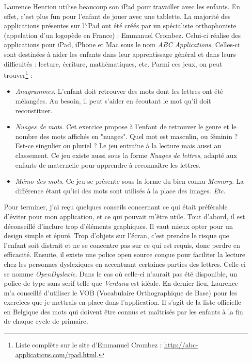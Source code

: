 Laurence Henrion utilise beaucoup son iPad pour travailler avec les enfants. En effet, c'est plus fun pour l'enfant de jouer avec une tablette.
La majorité des applications présentes sur l'iPad ont été créés par un spécialiste orthophoniste (appelation d'un logopède en France) : Emmanuel Crombez. Celui-ci réalise des applications pour iPad, iPhone et Mac sous le nom \textit{ABC Applications}. Celles-ci sont destinées à aider les enfants dans leur apprentissage général et dans leurs difficultés : lecture, écriture, mathématiques, etc. Parmi ces jeux, on peut trouver\footnote{Liste complète sur le site d'Emmanuel Crombez : \url{http://abc-applications.com/ipad.html}.} :
\begin{itemize}
\item \textit{Anagrammes}. L'enfant doit retrouver des mots dont les lettres ont été mélangées. Au besoin, il peut s'aider en écoutant le mot qu'il doit reconstituer.
\item \textit{Nuages de mots}. Cet exercice propose à l'enfant de retrouver le genre et le nombre des mots affichés en "nuages". Quel mot est masculin, ou féminin ? Est-ce singulier ou pluriel ? Le jeu entraîne à la lecture mais aussi au classement. Ce jeu existe aussi sous la forme \textit{Nuages de lettres}, adapté aux enfants de maternelle pour apprendre à reconnaître les lettres.
\item \textit{Mémo des mots}. Ce jeu se présente sous la forme du bien connu \textit{Memory}. La différence étant qu'ici des mots sont utilisés à la place des images.
\textit{Etc.}\\
\end{itemize}

Pour terminer, j'ai reçu quelques conseils concernant ce qui était préférable d'éviter pour mon application, et ce qui pouvait m'être utile. Tout d'abord, il est déconseillé d'inclure trop d'éléments graphiques. Il vaut mieux opter pour un design simple et épuré. Trop d'objets sur l'écran, c'est prendre le risque que l'enfant soit distrait et ne se concentre pas sur ce qui est requis, donc perdre en efficacité. Ensuite, il existe une police open source conçue pour faciliter la lecture chez les personnes dyslexiques en accentuant certaines parties des lettres. Celle-ci se nomme \textit{OpenDyslexic}. Dans le cas où celle-ci n'aurait pas été disponible, un police de type sans serif telle que \textit{Verdana} est idéale. En dernier lieu, Laurence m'a conseillé d'utiliser le VOB (Vocabulaire Orthographique de Base) pour les exercices que je mettrais en place dans l'application. Il s'agit de la liste officielle en Belgique des mots qui doivent être connus et maîtrisés par les enfants à la fin de chaque cycle de primaire.

